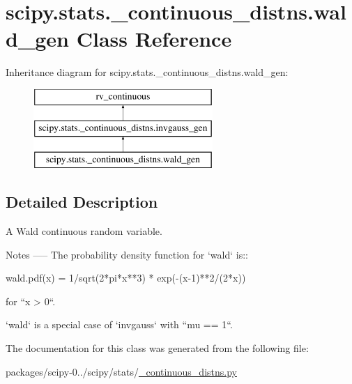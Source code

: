 \hypertarget{classscipy_1_1stats_1_1__continuous__distns_1_1wald__gen}{}\section{scipy.\+stats.\+\_\+continuous\+\_\+distns.\+wald\+\_\+gen Class Reference}
\label{classscipy_1_1stats_1_1__continuous__distns_1_1wald__gen}
Inheritance diagram for scipy.\+stats.\+\_\+continuous\+\_\+distns.\+wald\+\_\+gen\+:\begin{figure}[H]
\begin{center}
\leavevmode
\includegraphics[height=3.000000cm]{classscipy_1_1stats_1_1__continuous__distns_1_1wald__gen}
\end{center}
\end{figure}


\subsection{Detailed Description}
\begin{DoxyVerb}A Wald continuous random variable.


Notes
-----
The probability density function for `wald` is::

    wald.pdf(x) = 1/sqrt(2*pi*x**3) * exp(-(x-1)**2/(2*x))

for ``x > 0``.

`wald` is a special case of `invgauss` with ``mu == 1``.

\end{DoxyVerb}
 

The documentation for this class was generated from the following file\+:\begin{DoxyCompactItemize}
\item 
packages/scipy-\/0../scipy/stats/\hyperlink{__continuous__distns_8py}{\+\_\+continuous\+\_\+distns.\+py}\end{DoxyCompactItemize}

